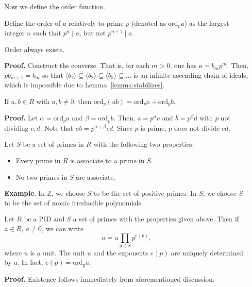 \documentclass{template}
\begin{document}
Now we define the order function.

\begin{definition}
    Define the order of $a$ relatively to prime $p$ (denoted as $\text{ord}_pa$)
    as the largest integer $n$ such that $p^n \mid a$, but not $p^{n+1} \mid a$.
\end{definition}

\begin{lemma}
    Order always exists.
\end{lemma}

\textbf{Proof.} Construct the converse. That is, for each $m>0$, one has
$a=b_mp^m$. Then, $pb_{m+1}=b_m$ so that $\langle b_1 \rangle \subseteq \langle
b_2 \rangle \subseteq \langle b_3 \rangle \subseteq \dots$ is an infinite
ascending chain of ideals, which is impossible due to
Lemma~\ref{lemma:stabilizes}.

\begin{lemma}
    If $a,b \in R$ with $a,b \neq 0$, then $\text{ord}_p(ab) = \text{ord}_pa +
    \text{ord}_pb$. 
\end{lemma}

\textbf{Proof.} Let $\alpha = \text{ord}_pa$ and $\beta=\text{ord}_pb$. Then,
$a=p^{\alpha}c$ and $b=p^{\beta}d$ with $p$ not dividing $c,d$. Note that 
$ab=p^{\alpha+\beta}cd$. Since $p$ is prime, $p$ does not divide $cd$. 

Let $S$ be a set of primes in $R$ with the following two properties:
\begin{itemize}
    \item[\textit{(a)}] Every prime in $R$ is associate to a prime in $S$.
    \item[\textit{(b)}] No two primes in $S$ are associate. 
\end{itemize}

\textbf{Example.} In $\mathbb{Z}$, we choose $S$ to be the set of positive
primes. In $S$, we choose $S$ to be the set of monic irreducible polynomials.

\begin{theorem}
    Let $R$ be a PID and $S$ a set of primes with the properties given above.
    Then if $a \in R$, $a \neq 0$, we can write
    \begin{equation*}
        a = u\prod_{p \in S}p^{e(p)},
    \end{equation*}
    where $u$ is a unit. The unit $u$ and the exponents $e(p)$ are uniquely
    determined by $a$. In fact, $e(p) = \text{ord}_pa$.
\end{theorem}
\textbf{Proof.} Existence follows immediately from aforementioned discussion.
\end{document}
